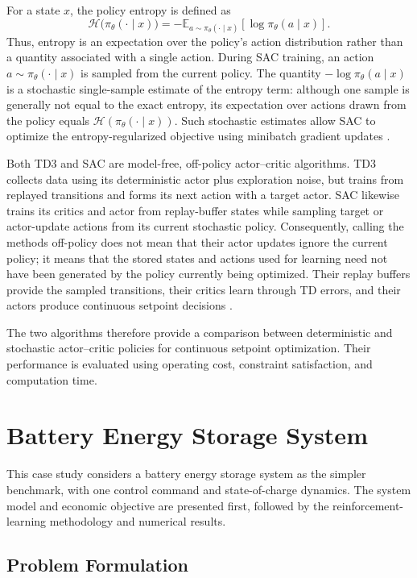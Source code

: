 \documentclass[12pt]{article}
\newcommand{\startnewpage}{\clearpage}
\begin{document}
For a state $x$, the policy entropy is defined as
\[
\mathcal{H}\bigl(\pi_\theta(\cdot\mid x)\bigr)
= -\mathbb{E}_{a\sim\pi_\theta(\cdot\mid x)}
\left[\log \pi_\theta(a\mid x)\right].
\]
Thus, entropy is an expectation over the policy's action distribution rather than a quantity associated with a single action. During SAC training, an action $a\sim\pi_\theta(\cdot\mid x)$ is sampled from the current policy. The quantity $-\log\pi_\theta(a\mid x)$ is a stochastic single-sample estimate of the entropy term: although one sample is generally not equal to the exact entropy, its expectation over actions drawn from the policy equals $\mathcal{H}(\pi_\theta(\cdot\mid x))$. Such stochastic estimates allow SAC to optimize the entropy-regularized objective using minibatch gradient updates \cite{haarnoja2018soft}.

Both TD3 and SAC are model-free, off-policy actor--critic algorithms. TD3 collects data using its deterministic actor plus exploration noise, but trains from replayed transitions and forms its next action with a target actor. SAC likewise trains its critics and actor from replay-buffer states while sampling target or actor-update actions from its current stochastic policy. Consequently, calling the methods off-policy does not mean that their actor updates ignore the current policy; it means that the stored states and actions used for learning need not have been generated by the policy currently being optimized. Their replay buffers provide the sampled transitions, their critics learn through TD errors, and their actors produce continuous setpoint decisions \cite{fujimoto2018addressing,haarnoja2018soft}.

The two algorithms therefore provide a comparison between deterministic and stochastic actor--critic policies for continuous setpoint optimization. Their performance is evaluated using operating cost, constraint satisfaction, and computation time.

\startnewpage
\section{Battery Energy Storage System}
\label{sec:battery_case}

This case study considers a battery energy storage system as the simpler benchmark, with one control command and state-of-charge dynamics. The system model and economic objective are presented first, followed by the reinforcement-learning methodology and numerical results.

\subsection{Problem Formulation}
\label{sec:battery_problem}
\end{document}
